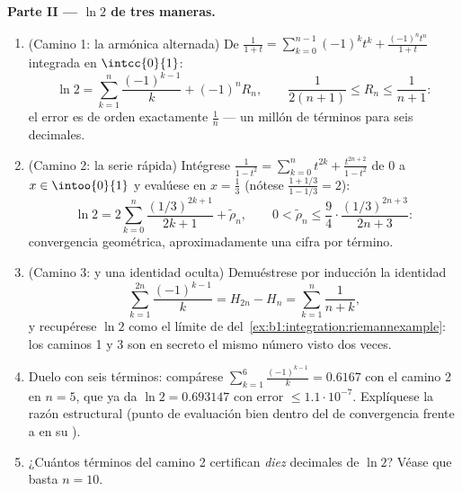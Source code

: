 \begin{problem}
\medskip
\noindent\textbf{Parte II --- $\ln 2$ de tres maneras.}
\begin{enumerate}[resume]
  \item (Camino 1: la armónica alternada) De
        $\frac{1}{1+t} = \sum_{k=0}^{n-1}(-1)^k t^k +
        \frac{(-1)^n t^n}{1+t}$ integrada en $\intcc{0}{1}$:
        \[
        \ln 2 = \sum_{k=1}^{n} \frac{(-1)^{k-1}}{k} + (-1)^n
        R_n, \qquad \frac{1}{2(n+1)} \leq R_n \leq
        \frac{1}{n+1} :
        \]
        el error es de orden exactamente $\frac 1n$ --- un millón de
        términos para seis decimales.
  \item (Camino 2: la serie rápida) Intégrese
        $\frac{1}{1 - t^2} = \sum_{k=0}^{n} t^{2k} +
        \frac{t^{2n+2}}{1-t^2}$ de $0$ a $x \in \intoo{0}{1}$ y
        evalúese en $x = \frac13$ (nótese
        $\frac{1 + 1/3}{1 - 1/3} = 2$):
        \[
        \ln 2 = 2\sum_{k=0}^{n} \frac{(1/3)^{2k+1}}{2k+1} +
        \tilde\rho_n,
        \qquad
        0 < \tilde\rho_n \leq \frac{9}{4}\cdot
        \frac{(1/3)^{2n+3}}{2n+3} :
        \]
        convergencia geométrica, aproximadamente una cifra por
        término.
  \item (Camino 3:  y una identidad oculta)
        Demuéstrese por inducción la identidad
        \[
        \sum_{k=1}^{2n} \frac{(-1)^{k-1}}{k} = H_{2n} - H_n =
        \sum_{k=1}^{n} \frac{1}{n + k} ,
        \]
        y recupérese $\ln 2$ como el límite de 
        del~\cref{ex:b1:integration:riemannexample}: los caminos 1 y
        3 son en secreto el mismo número visto dos veces.
  \item Duelo con seis términos: compárese
        $\sum_{k=1}^{6} \frac{(-1)^{k-1}}{k} = 0.6167$ con el
        camino 2 en $n = 5$, que ya da $\ln 2 = 0.693147$ con error
        $\leq 1.1\cdot10^{-7}$. Explíquese la razón estructural
        (punto de evaluación bien dentro del  de
        convergencia frente a en su ).
  \item ¿Cuántos términos del camino 2 certifican \emph{diez}
        decimales de $\ln 2$? Véase que basta $n = 10$.
\end{enumerate}


\end{problem}
